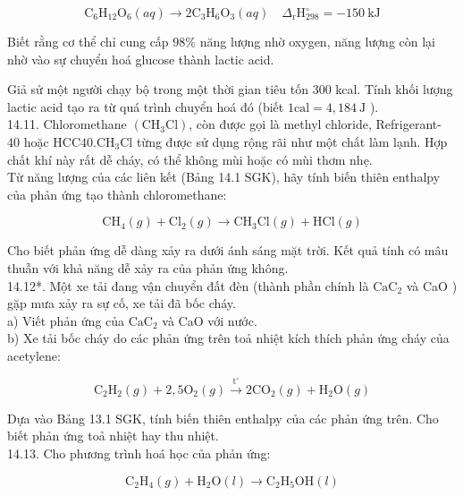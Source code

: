 \documentclass[10pt]{article}
\begin{document}
$$
\mathrm{C}_{6} \mathrm{H}_{12} \mathrm{O}_{6}(a q) \rightarrow 2 \mathrm{C}_{3} \mathrm{H}_{6} \mathrm{O}_{3}(a q) \quad \Delta_{\mathrm{r}} \mathrm{H}_{298}^{\circ}=-150 \mathrm{~kJ}
$$

Biết rằng cơ thể chỉ cung cấp $98 \%$ năng lượng nhờ oxygen, năng lượng còn lại nhờ vào sự chuyển hoá glucose thành lactic acid.

Giả sử một người chạy bộ trong một thời gian tiêu tốn 300 kcal. Tính khối lượng lactic acid tạo ra từ quá trình chuyển hoá đó (biết $1 \mathrm{cal}=4,184 \mathrm{~J}$ ).\\
14.11. Chloromethane $\left(\mathrm{CH}_{3} \mathrm{Cl}\right)$, còn được gọi là methyl chloride, Refrigerant- 40 hoặc $\mathrm{HCC} 40 . \mathrm{CH}_{3} \mathrm{Cl}$ từng được sử dụng rộng rãi như một chất làm lạnh. Hợp chất khí này rất dễ cháy, có thể không mùi hoặc có mùi thơm nhẹ.\\
Từ năng lượng của các liên kết (Bảng 14.1 SGK), hãy tính biến thiên enthalpy của phản ứng tạo thành chloromethane:

$$
\mathrm{CH}_{4}(g)+\mathrm{Cl}_{2}(g) \rightarrow \mathrm{CH}_{3} \mathrm{Cl}(g)+\mathrm{HCl}(g)
$$

Cho biết phản ứng dễ dàng xảy ra dưới ánh sáng mặt trời. Kết quả tính có mâu thuẫn với khả năng dễ xảy ra của phản ứng không.\\
14.12*. Một xe tải đang vận chuyển đất đèn (thành phần chính là $\mathrm{CaC}_{2}$ và CaO ) gặp mưa xảy ra sự cố, xe tải đã bốc cháy.\\
a) Viết phản ứng của $\mathrm{CaC}_{2}$ và CaO với nước.\\
b) Xe tải bốc cháy do các phản ứng trên toả nhiệt kích thích phản ứng cháy của acetylene:

$$
\mathrm{C}_{2} \mathrm{H}_{2}(g)+2,5 \mathrm{O}_{2}(g) \xrightarrow{\mathrm{t}^{\circ}} 2 \mathrm{CO}_{2}(g)+\mathrm{H}_{2} \mathrm{O}(g)
$$

Dựa vào Bảng 13.1 SGK, tính biến thiên enthalpy của các phản ứng trên. Cho biết phản ứng toả nhiệt hay thu nhiệt.\\
14.13. Cho phương trình hoá học của phản ứng:

$$
\mathrm{C}_{2} \mathrm{H}_{4}(g)+\mathrm{H}_{2} \mathrm{O}(l) \rightarrow \mathrm{C}_{2} \mathrm{H}_{5} \mathrm{OH}(l)
$$
\end{document}
